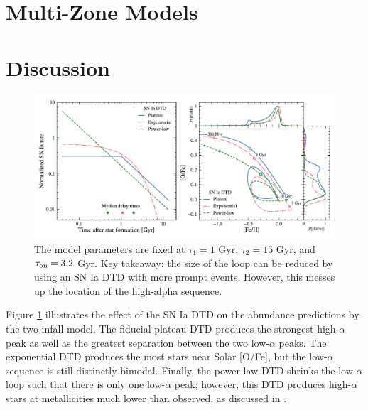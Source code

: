 \documentclass[twocolumn,twocolappendix,linenumbers]{aastex631}
\begin{document}
\section{Multi-Zone Models}
\label{sec:multizone-results}

\section{Discussion}
\label{sec:discussion}

\begin{figure}
    \centering
    \includegraphics{figures/delay_time_distribution.pdf}
    \caption{The model parameters are fixed at $\tau_1=1$ Gyr, $\tau_2=15$ Gyr, and $\tau_{\rm on}=3.2$ Gyr. Key takeaway: the size of the loop can be reduced by using an SN Ia DTD with more prompt events. However, this messes up the location of the high-alpha sequence.}
    \label{fig:dtd}
\end{figure}

Figure \ref{fig:dtd} illustrates the effect of the SN Ia DTD on the abundance predictions by the two-infall model. The fiducial plateau DTD produces the strongest high-$\alpha$ peak as well as the greatest separation between the two low-$\alpha$ peaks. The exponential DTD produces the most stars near Solar [O/Fe], but the low-$\alpha$ sequence is still distinctly bimodal. Finally, the power-law DTD shrinks the low-$\alpha$ loop such that there is only one low-$\alpha$ peak; however, this DTD produces high-$\alpha$ stars at metallicities much lower than observed, as discussed in \citet{dubay_galactic_2024}.
\end{document}
